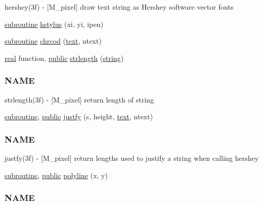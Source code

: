 \begin{DoxyCompactItemize}
\begin{DoxyCompactList}
hershey(3f) -\/ \mbox{[}M\+\_\+pixel\mbox{]} draw text string as Hershey software vector fonts \end{DoxyCompactList}\item 
\hyperlink{M__stopwatch_83_8txt_acfbcff50169d691ff02d4a123ed70482}{subroutine} \hyperlink{namespacem__pixel_a15c5daa9ab477991c2c6e17741cf40eb}{hstylus} (xi, yi, ipen)
\item 
\hyperlink{M__stopwatch_83_8txt_acfbcff50169d691ff02d4a123ed70482}{subroutine} \hyperlink{namespacem__pixel_ab25c6cce708ff91a79bbabb23d591a8b}{chrcod} (\hyperlink{README_8txt_afda9e6898bd09238e9e9be4c62ce246b}{text}, ntext)
\item 
\hyperlink{read__watch_83_8txt_abdb62bde002f38ef75f810d3a905a823}{real} function, \hyperlink{M__stopwatch_83_8txt_a2f74811300c361e53b430611a7d1769f}{public} \hyperlink{namespacem__pixel_a0468f8d9308bade7f8f2a68a133271d2}{strlength} (\hyperlink{what__overview_81_8txt_a74cb7e955273b9f9157b4f0c18a38849}{string})
\begin{DoxyCompactList}\small\item\em \subsubsection*{N\+A\+ME}

strlength(3f) -\/ \mbox{[}M\+\_\+pixel\mbox{]} return length of string \end{DoxyCompactList}\item 
\hyperlink{M__stopwatch_83_8txt_acfbcff50169d691ff02d4a123ed70482}{subroutine}, \hyperlink{M__stopwatch_83_8txt_a2f74811300c361e53b430611a7d1769f}{public} \hyperlink{namespacem__pixel_a7b08886c913b47694edeb60fa747afc4}{justfy} (s, height, \hyperlink{README_8txt_afda9e6898bd09238e9e9be4c62ce246b}{text}, ntext)
\begin{DoxyCompactList}\small\item\em \subsubsection*{N\+A\+ME}

justfy(3f) -\/ \mbox{[}M\+\_\+pixel\mbox{]} return lengths used to justify a string when calling hershey \end{DoxyCompactList}\item 
\hyperlink{M__stopwatch_83_8txt_acfbcff50169d691ff02d4a123ed70482}{subroutine}, \hyperlink{M__stopwatch_83_8txt_a2f74811300c361e53b430611a7d1769f}{public} \hyperlink{namespacem__pixel_a067e896f50047694a52c30cffa6f502f}{polyline} (x, y)
\begin{DoxyCompactList}\small\item\em \subsubsection*{N\+A\+ME}


\end{DoxyCompactList}
\end{DoxyCompactItemize}
